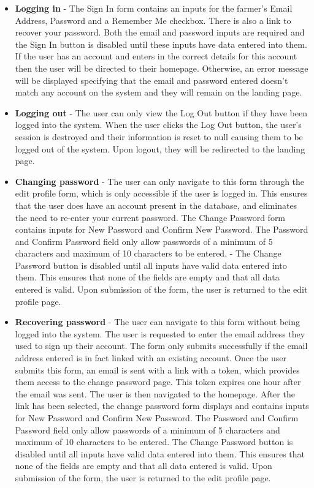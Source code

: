 \documentclass[11pt,fleqn]{book} %
\begin{document}
\begin{itemize}
				\item\textbf{Logging in} -
				The Sign In form contains an inputs for the farmer's Email Address, Password and a Remember Me checkbox. There is also a link to recover your password. Both the email and password inputs are required and the Sign In button is disabled until these inputs have data entered into them. If the user has an account and enters in the correct details for this account then the user will be directed to their homepage. Otherwise, an error message will be displayed specifying that the email and password entered doesn't match any account on the system and they will remain on the landing page.
				
				\item\textbf{Logging out} -
				The user can only view the Log Out button if they have been logged into the system. When the user clicks the Log Out button, the user's session is destroyed and their information is reset to null causing them to be logged out of the system. Upon logout, they will be redirected to the landing page.
				
				\item\textbf{Changing password} -
				The user can only navigate to this form through the edit profile form, which is only accessible if the user is logged in. This ensures that the user does have an account present in the database, and eliminates the need to re-enter your current password. The Change Password form contains inputs for New Password and Confirm New Password. The Password and Confirm Password field only allow passwords of a minimum of 5 characters and maximum of 10 characters to be entered. 
				-%
				The Change Password button is disabled until all inputs have valid data entered into them. This ensures that none of the fields are empty and that all data entered is valid. Upon submission of the form, the user is returned to the edit profile page.
				
				\item\textbf{Recovering password} -
				The user can navigate to this form without being logged into the system. The user is requested to enter the email address they used to sign up their account. The form only submits successfully if the email address entered is in fact linked with an existing account. Once the user submits this form, an email is sent with a link with a token, which provides them access to the change password page. This token expires one hour after the email was sent. The user is then navigated to the homepage. After the link has been selected, the change password form displays and contains inputs for New Password and Confirm New Password. The Password and Confirm Password field only allow passwords of a minimum of 5 characters and maximum of 10 characters to be entered. The Change Password button is disabled until all inputs have valid data entered into them. This ensures that none of the fields are empty and that all data entered is valid. Upon submission of the form, the user is returned to the edit profile page.
			\end{itemize}
\end{document}
